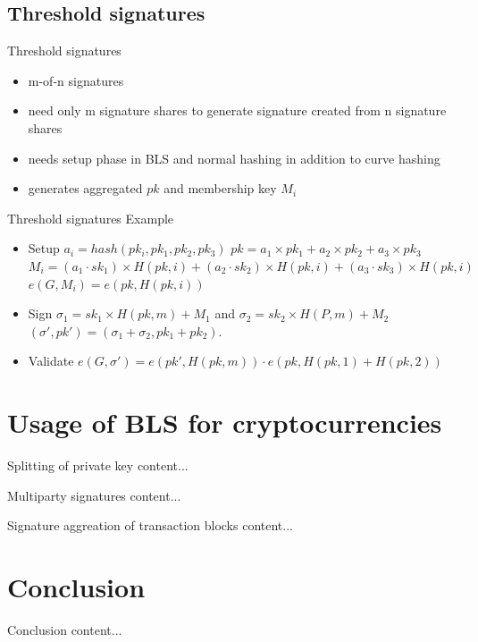 \documentclass{beamer}
\begin{document}
\subsection{Threshold signatures}
\begin{frame}{Threshold signatures}
	\begin{itemize}
		\item m-of-n signatures
		\item need only m signature shares to generate signature created from n signature shares
		\item needs setup phase in BLS and normal hashing in addition to curve hashing
		\item generates aggregated $pk$ and membership key $M_i$		
	\end{itemize}
\end{frame}
\begin{frame}{Threshold signatures}
	Example
	\begin{itemize}
		\item Setup \newline
		$a_i = hash(pk_i,{pk_1,pk_2,pk_3})$ \newline
		$pk = a_1\times{pk_1}+a_2\times{pk_2}+a_3\times{pk_3}$ \newline
		$M_i = (a_1 \cdot sk_1) \times{H(pk,i)} + (a_2 \cdot sk_2) \times{H(pk,i)} + (a_3 \cdot sk_3) \times{H(pk,i)}$ \newline
		$e(G,M_i) = e(pk,H(pk,i))$
		\item Sign \newline
		$\sigma_1 = sk_1 \times{H(pk,m)} + M_1$ and $\sigma_2 = sk_2 \times{H(P,m)} + M_2$
		$(\sigma',pk') = (\sigma_1 + \sigma_2, pk_1 + pk_2)$.
		\item Validate \newline
		$e(G,\sigma') = e(pk',H(pk,m)) \cdot e(pk, H(pk,1)+H(pk,2))$
	\end{itemize}
\end{frame}
\section{Usage of BLS for cryptocurrencies}
\begin{frame}{Splitting of private key}
	content...
\end{frame}
\begin{frame}{Multiparty signatures}
	content...
\end{frame}
\begin{frame}{Signature aggreation of transaction blocks}
	content...
\end{frame}
\section{Conclusion}
\begin{frame}{Conclusion}
	content...
\end{frame}
\end{document}
